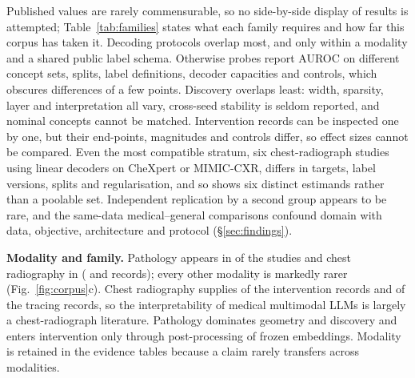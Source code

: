 Published values are rarely commensurable, so no side-by-side display of results is attempted;
Table~\ref{tab:families} states what each family requires and how far this corpus has taken it. Decoding
protocols overlap most, and only within a modality and a shared public label schema. Otherwise probes
report AUROC on different concept sets, splits, label definitions, decoder capacities and controls, which
obscures differences of a few points. Discovery overlaps least: width, sparsity, layer and
interpretation all vary, cross-seed stability is seldom reported, and nominal concepts cannot be
matched. Intervention records can be inspected one by one, but their end-points, magnitudes and controls
differ, so effect sizes cannot be compared. Even the most compatible stratum, six chest-radiograph
studies using linear decoders on CheXpert or MIMIC-CXR, differs in targets, label versions, splits and
regularisation, and so shows six distinct estimands rather than a poolable set. Independent replication
by a second group appears to be rare, and the same-data medical--general comparisons confound domain with
data, objective, architecture and protocol (\S\ref{sec:findings}).

\textbf{Modality and family.} Pathology appears in \Npathstud{} of the \Ncore{} studies and chest
radiography in \Ncxrstud{} (\Npathrec{} and \Ncxrrec{} records); every other modality is markedly rarer
(Fig.~\ref{fig:corpus}c). Chest radiography supplies \Nintcxr{} of the \Nintrec{} intervention records
and \Ntracecxr{} of the \Ntracerec{} tracing records, so the interpretability of medical multimodal
LLMs is largely a chest-radiograph literature. Pathology dominates geometry and discovery and enters
intervention only through post-processing of frozen embeddings. Modality is retained in the evidence
tables because a claim rarely transfers across modalities.

